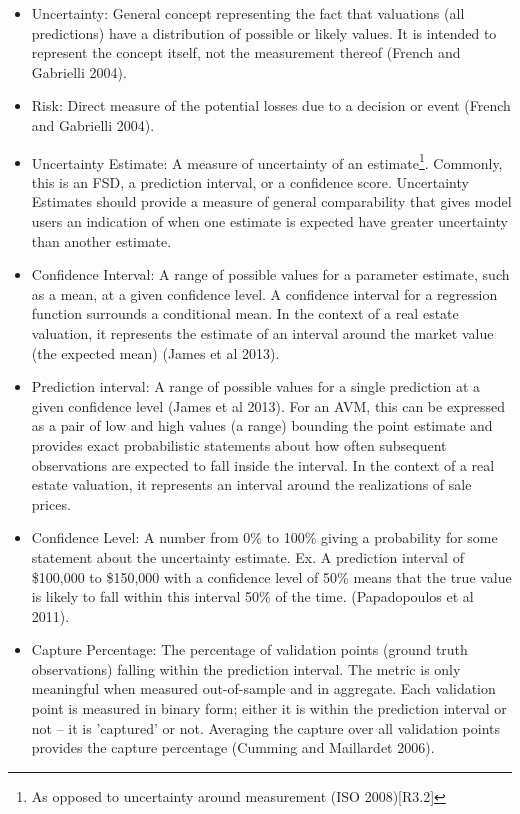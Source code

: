 \documentclass[colTwo]{anon}
\theoremstyle{definition}
\begin{document}
\begin{itemize}
\item Uncertainty: General concept representing the fact that valuations (all predictions) have a distribution of possible or likely values.  It is intended to represent the concept itself, not the measurement thereof (French and Gabrielli 2004). 
\item Risk: Direct measure of the potential losses due to a decision or event (French and Gabrielli 2004).
\item Uncertainty Estimate: A measure of uncertainty of an estimate\footnote{As opposed to uncertainty around measurement (ISO 2008)[R3.2]}. Commonly, this is an FSD, a prediction interval, or a confidence score. Uncertainty Estimates should provide a measure of general comparability that gives model users an indication of when one estimate is expected have greater uncertainty than another estimate.
\item Confidence Interval: A range of possible values for a parameter estimate, such as a mean, at a given confidence level. A confidence interval for a regression function surrounds a conditional mean. In the context of a real estate valuation, it represents the estimate of an interval around the market value (the expected mean) (James et al 2013).
\item Prediction interval: A range of possible values for a single prediction at a given confidence level (James et al 2013). For an AVM, this can be expressed as a pair of low and high values (a range) bounding the point estimate and provides exact probabilistic statements about how often subsequent observations are expected to fall inside the interval. In the context of a real estate valuation, it represents an interval around the realizations of sale prices. 
\item Confidence Level: A number from 0\% to 100\% giving a probability for some statement about the uncertainty estimate. Ex. A prediction interval of \$100,000 to \$150,000 with a confidence level of 50\% means that the true value is likely to fall within this interval 50\% of the time. (Papadopoulos et al 2011).
\item Capture Percentage: The percentage of validation points (ground truth observations) falling within the prediction interval. The metric is only meaningful when measured out-of-sample and in aggregate. Each validation point is measured in binary form; either it is within the prediction interval or not -- it is 'captured' or not. Averaging the capture over all validation points provides the capture percentage (Cumming and Maillardet 2006).

\end{itemize}
\end{document}
